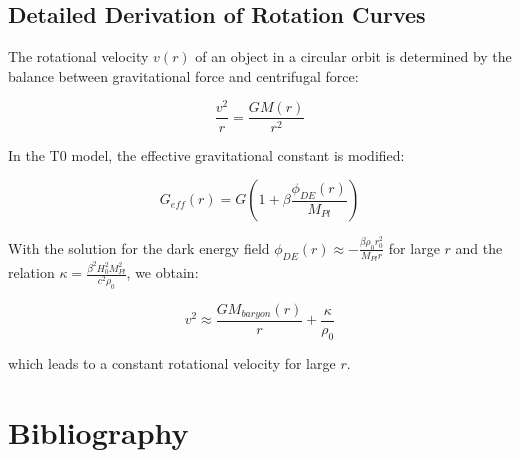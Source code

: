 \documentclass[a4paper,12pt]{article}
\begin{document}
\subsection{Detailed Derivation of Rotation Curves}

The rotational velocity $v(r)$ of an object in a circular orbit is determined by the balance between gravitational force and centrifugal force:

\begin{equation}
	\frac{v^2}{r} = \frac{GM(r)}{r^2}
\end{equation}

In the T0 model, the effective gravitational constant is modified:

\begin{equation}
	G_{eff}(r) = G\left(1 + \beta\frac{\phi_{DE}(r)}{M_{Pl}}\right)
\end{equation}

With the solution for the dark energy field $\phi_{DE}(r) \approx -\frac{\beta\rho_0 r_0^2}{M_{Pl}r}$ for large $r$ and the relation $\kappa = \frac{\beta^2 H_0^2 M_{Pl}^2}{c^2 \rho_0}$, we obtain:

\begin{equation}
	v^2 \approx \frac{GM_{baryon}(r)}{r} + \frac{\kappa}{\rho_0}
\end{equation}

which leads to a constant rotational velocity for large $r$.

\section{Bibliography}
\end{document}

